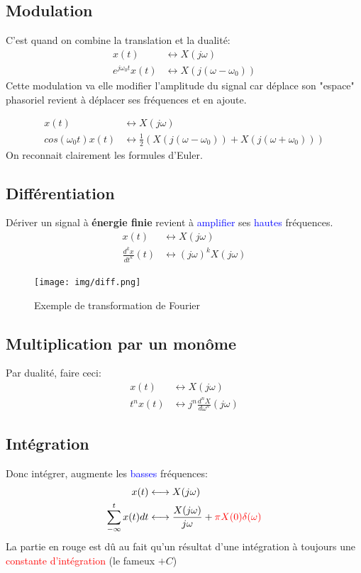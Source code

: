 \documentclass{report}
\begin{document}
\subsection{Modulation}
C'est quand on combine la translation et la dualité:
\begin{align*}
x(t) & \longleftrightarrow X(j\omega)\\
e^{j\omega_0 t}x(t) & \longleftrightarrow X(j(\omega - \omega_0))
\end{align*}
Cette modulation va elle modifier l'amplitude du signal car déplace son "espace" phasoriel revient à déplacer ses fréquences et en ajoute.

\begin{align*}
x(t) & \longleftrightarrow X(j\omega)\\
cos(\omega_0 t)x(t) &\longleftrightarrow \frac{1}{2}(X(j(\omega - \omega_0)) + X(j(\omega + \omega_0))) 
\end{align*}
On reconnait clairement les formules d'Euler.

\subsection{Différentiation}
Dériver un signal à \textbf{énergie finie} revient à \textcolor{blue}{amplifier} ses \textcolor{blue}{hautes} fréquences.
\begin{align*}
x(t) &\longleftrightarrow X(j\omega)\\
\frac{d^kx}{dt^k}(t) &\longleftrightarrow (j\omega)^kX(j\omega)
\end{align*}
\begin{figure}[H]
\centering
\texttt{[image: img/diff.png]}
\caption{Exemple de transformation de Fourier}
\end{figure}

\subsection{Multiplication par un monôme}
Par dualité, faire ceci:
\begin{align*}
x(t) &\longleftrightarrow X(j\omega)\\
t^nx(t) &\longleftrightarrow j^n \frac{d^nX}{d\omega^n} (j\omega)
\end{align*}
\subsection{Intégration}
Donc intégrer, augmente les \textcolor{blue}{basses} fréquences:
\begin{align*}
x(t) &\longleftrightarrow X(j\omega)\\
\sum_{-\infty}^t	x(t)dt &\longleftrightarrow \frac{X(j\omega)}{j\omega} + \textcolor{red}{\pi X(0) \delta(\omega)}
\end{align*}
La partie en rouge est dû au fait qu'un résultat d'une intégration à toujours une \textcolor{red}{constante d'intégration} (le fameux $+C$)
\end{document}
